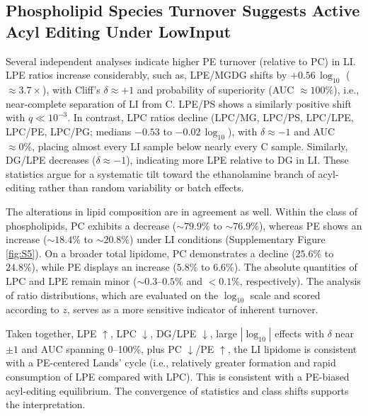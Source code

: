\documentclass[10pt,letterpaper]{article}
\begin{document}
\begin{itemize}



\subsection*{Phospholipid Species Turnover Suggests Active Acyl Editing Under LowInput}

Several independent analyses indicate higher PE turnover (relative to PC) in LI. LPE ratios increase considerably, such as, LPE/MGDG shifts by  $+0.56 \,\log_{10}$ ($\approx 3.7\times$), with Cliff’s $\delta \approx +1$ and probability of superiority (AUC $\approx 100\%$), i.e., near-complete separation of LI from C. LPE/PS shows a similarly positive shift with $q \ll 10^{-3}$. In contrast, LPC ratios decline (LPC/MG, LPC/PS, LPC/LPE, LPC/PE, LPC/PG; medians $-0.53$ to $-0.02 \,\log_{10}$), with 
$\delta \approx -1$ and AUC $\approx 0\%$, placing almost every LI sample below nearly every C sample. 
Similarly, DG/LPE decreases ($\delta \approx -1$), indicating more LPE relative to DG in LI. 
These statistics argue for a systematic tilt toward the ethanolamine branch of acyl-editing 
rather than random variability or batch effects.

The alterations in lipid composition are in agreement as well. Within the class of phospholipids, PC exhibits a decrease ($\sim 79.9\% $ to $ \sim 76.9\%$), whereas PE shows an increase ($\sim 18.4\% $ to $ \sim 20.8\%$) under LI conditions (Supplementary Figure \ref{fig:S5}). On a broader total lipidome, PC demonstrates a decline ($25.6\% $ to $ 24.8\%$), while PE displays an increase ($5.8\% $ to $ 6.6\%$). The absolute quantities of LPC and LPE remain minor ($\sim 0.3$–$0.5\%$ and $<0.1\%$, respectively). The analysis of ratio distributions, which are evaluated on the $\log_{10}$ scale and scored according to $z$, serves as a more sensitive indicator of inherent turnover.

Taken together, LPE $\uparrow$, LPC $\downarrow$, DG/LPE $\downarrow$, large $|\log_{10}|$ effects with 
$\delta$ near $\pm 1$ and AUC spanning 0–100\%, plus PC $\downarrow$/PE $\uparrow$, the LI lipidome is 
consistent with a PE-centered Lands’ cycle (i.e., relatively greater formation and rapid consumption 
of LPE compared with LPC). This is consistent with a PE-biased acyl-editing equilibrium. The convergence of statistics and class shifts supports the interpretation.


\end{itemize}
\end{document}
